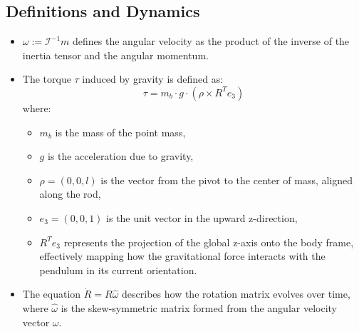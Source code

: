 \subsection{Definitions and Dynamics}
\begin{itemize}
    \item \(\omega := \mathcal{I}^{-1}m\) defines the angular velocity as the product of the inverse of the inertia tensor and the angular momentum.
    \item The torque \(\tau\) induced by gravity is defined as:
    \[
    \tau = m_b \cdot g \cdot (\rho \times R^T e_3)
    \]
    where:
    \begin{itemize}
        \item \(m_b\) is the mass of the point mass,
        \item \(g\) is the acceleration due to gravity,
        \item \(\rho = (0, 0, l)\) is the vector from the pivot to the center of mass, aligned along the rod,
        \item \(e_3 = (0, 0, 1)\) is the unit vector in the upward z-direction,
        \item \(R^T e_3\) represents the projection of the global z-axis onto the body frame, effectively mapping how the gravitational force interacts with the pendulum in its current orientation.
    \end{itemize}
    \item The equation \(\dot{R} = R \hat{\omega}\) describes how the rotation matrix evolves over time, where \(\hat{\omega}\) is the skew-symmetric matrix formed from the angular velocity vector \(\omega\).
\end{itemize}


